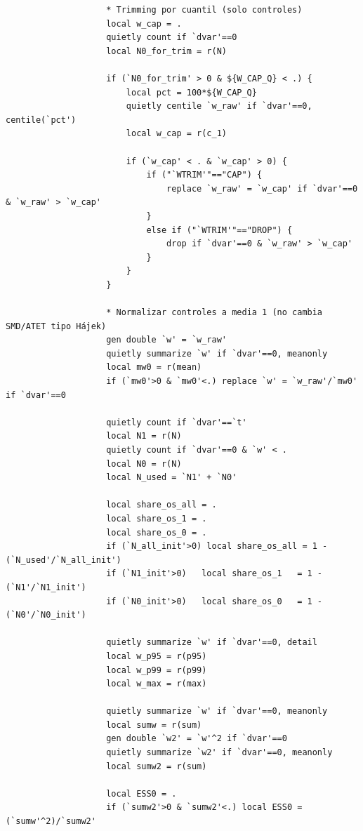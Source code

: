 \documentclass[12pt]{article}
\begin{document}
\begin{lstlisting}
                    * Trimming por cuantil (solo controles)
                    local w_cap = .
                    quietly count if `dvar'==0
                    local N0_for_trim = r(N)

                    if (`N0_for_trim' > 0 & ${W_CAP_Q} < .) {
                        local pct = 100*${W_CAP_Q}
                        quietly centile `w_raw' if `dvar'==0, centile(`pct')
                        local w_cap = r(c_1)

                        if (`w_cap' < . & `w_cap' > 0) {
                            if ("`WTRIM'"=="CAP") {
                                replace `w_raw' = `w_cap' if `dvar'==0 & `w_raw' > `w_cap'
                            }
                            else if ("`WTRIM'"=="DROP") {
                                drop if `dvar'==0 & `w_raw' > `w_cap'
                            }
                        }
                    }

                    * Normalizar controles a media 1 (no cambia SMD/ATET tipo Hájek)
                    gen double `w' = `w_raw'
                    quietly summarize `w' if `dvar'==0, meanonly
                    local mw0 = r(mean)
                    if (`mw0'>0 & `mw0'<.) replace `w' = `w_raw'/`mw0' if `dvar'==0

                    quietly count if `dvar'==`t'
                    local N1 = r(N)
                    quietly count if `dvar'==0 & `w' < .
                    local N0 = r(N)
                    local N_used = `N1' + `N0'

                    local share_os_all = .
                    local share_os_1 = .
                    local share_os_0 = .
                    if (`N_all_init'>0) local share_os_all = 1 - (`N_used'/`N_all_init')
                    if (`N1_init'>0)   local share_os_1   = 1 - (`N1'/`N1_init')
                    if (`N0_init'>0)   local share_os_0   = 1 - (`N0'/`N0_init')

                    quietly summarize `w' if `dvar'==0, detail
                    local w_p95 = r(p95)
                    local w_p99 = r(p99)
                    local w_max = r(max)

                    quietly summarize `w' if `dvar'==0, meanonly
                    local sumw = r(sum)
                    gen double `w2' = `w'^2 if `dvar'==0
                    quietly summarize `w2' if `dvar'==0, meanonly
                    local sumw2 = r(sum)

                    local ESS0 = .
                    if (`sumw2'>0 & `sumw2'<.) local ESS0 = (`sumw'^2)/`sumw2'


\end{lstlisting}
\end{document}

